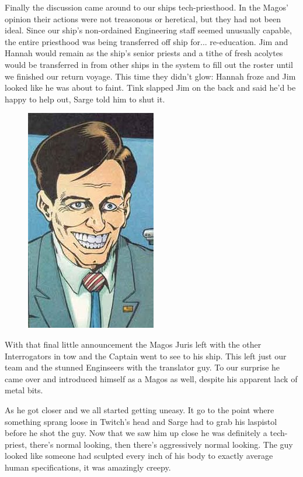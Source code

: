 Finally the discussion came around to our ships tech-priesthood. 
In the Magos' opinion their actions were not treasonous or heretical, but they had not been ideal. 
Since our ship's non-ordained Engineering staff seemed unusually capable, the entire priesthood was being transferred off ship for... 
re-education. 
Jim and Hannah would remain as the ship's senior priests and a tithe of fresh acolytes would be transferred in from other ships in the system to fill out the roster until we finished our return voyage. 
This time they didn't glow: 
Hannah froze and Jim looked like he was about to faint. 
Tink slapped Jim on the back and said he'd be happy to help out, Sarge told him to shut it.

\begin{figure}
	\begin{center}
		\includegraphics[width=\figwidth]{pics/11/101.png}
	\end{center}
\end{figure}
With that final little announcement the Magos Juris left with the other Interrogators in tow and the Captain went to see to his ship. 
This left just our team and the stunned Enginseers with the translator guy. 
To our surprise he came over and introduced himself as a Magos as well, despite his apparent lack of metal bits.

As he got closer and we all started getting uneasy. 
It go to the point where something sprang loose in Twitch's head and Sarge had to grab his laspistol before he shot the guy. 
Now that we saw him up close he was definitely a tech-priest, there's normal looking, then there's aggressively normal looking. 
The guy looked like someone had sculpted every inch of his body to exactly average human specifications, it was amazingly creepy.

